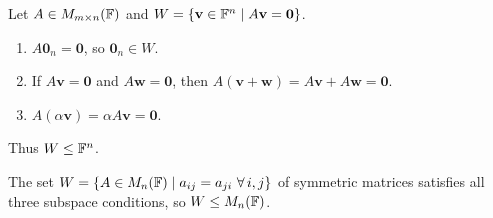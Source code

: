 \begin{exbox}[Example --- Solution Set of $A\mathbf{x}=\mathbf{0}$ is a Subspace]
Let $A\in M_{m\times n}(\mathbb{F})$ and $W=\{\mathbf{v}\in\mathbb{F}^n\mid A\mathbf{v}=\mathbf{0}\}$.
\begin{enumerate}[label=(\roman*)]
    \item $A\mathbf{0}_n=\mathbf{0}$, so $\mathbf{0}_n\in W$. \checkmark
    \item If $A\mathbf{v}=\mathbf{0}$ and $A\mathbf{w}=\mathbf{0}$, then
          $A(\mathbf{v}+\mathbf{w})=A\mathbf{v}+A\mathbf{w}=\mathbf{0}$. \checkmark
    \item $A(\alpha\mathbf{v})=\alpha A\mathbf{v}=\mathbf{0}$. \checkmark
\end{enumerate}
Thus $W\leq\mathbb{F}^n$.
\end{exbox}

\begin{exbox}
The set $W=\{A\in\Mn{n}\mid a_{ij}=a_{ji}\ \forall\,i,j\}$ of symmetric
matrices satisfies all three subspace conditions, so $W\leq M_{n}(\mathbb{F})$.
\end{exbox}
